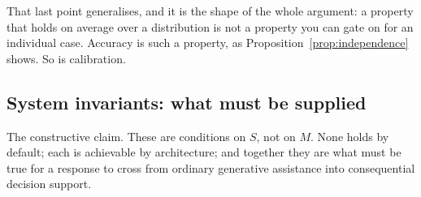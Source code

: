 \documentclass[11pt]{article}
\theoremstyle{plain}
\theoremstyle{definition}
\begin{document}
That last point generalises, and it is the shape of the whole argument: a property
that holds on average over a distribution is not a property you can gate on for an
individual case. Accuracy is such a property, as
Proposition~\ref{prop:independence} shows. So is calibration.

\subsection{System invariants: what must be supplied}

The constructive claim. These are conditions on $S$, not on $M$. None holds by
default; each is achievable by architecture; and together they are what must be
true for a response to cross from ordinary generative assistance into consequential
decision support.
\end{document}
